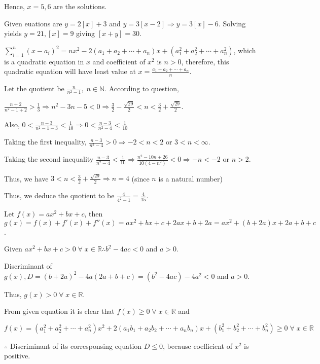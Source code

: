   Hence, $x = 5, 6$ are the solutions.
\item Given euations are $y = 2[x] + 3$ and $y = 3[x - 2] \Rightarrow y = 3[x] - 6$. Solving yields $y = 21,
  [x] = 9$ giving $[x + y] = 30$.
\item $\displaystyle\sum_{i=1}^n(x - a_i)^2 = nx^2 - 2(a_1 + a_2 + \cdots + a_n)x + (a_1^2 + a_2^2 + \cdots
  + a_n^2)$, which is a quadratic equation in $x$ and coefficient of $x^2$ is $n > 0$, therefore, this
  quadratic equation will have least value at $x = \frac{a_1 + a_2 + \cdots + a_n}{n}$.
\item Let the quotient be $\frac{n}{n^2 - 1},\;n\in\mathbb{N}$. According to question,

  $\frac{n + 2}{n^2 - 1 + 2}> \frac{1}{3}\Rightarrow n^2 - 3n - 5 < 0 \Rightarrow \frac{3}{2} -
  \frac{\sqrt{29}}{2} < n < \frac{3}{2} + \frac{\sqrt{29}}{2}$.

  Also, $0<\frac{n - 3}{n^2 - 1 - 3} < \frac{1}{10}\Rightarrow 0 < \frac{n - 3}{n^2 - 4} < \frac{1}{10}$

  Taking the first inequality, $\frac{n - 3}{n^2 - 4} > 0 \Rightarrow -2 < n < 2$ or $3 < n < \infty$.

  Taking the second inequality $\frac{n - 3}{n^2 - 4} < \frac{1}{10} \Rightarrow \frac{n^2 - 10n + 26}{10(4
    - n^2)} < 0 \Rightarrow -n < -2$  or $n > 2$.

  Thus, we have $3 < n < \frac{3}{2} + \frac{\sqrt{29}}{2}\Rightarrow n = 4$ (since $n$ is a natural number)

  Thus, we deduce the quotient to be $\frac{4}{4^2 - 1} = \frac{4}{15}$.
\item Let $f(x) = ax^2 + bx + c$, then $g(x) = f(x) + f'(x) + f''(x) = ax^2 + bx + c + 2ax + b + 2a = ax^2 +
  (b + 2a)x + 2a + b + c$.

  Given $ax^2 + bx + c > 0\;\forall\;x\in\mathbb{R}\therefore b^2 - 4ac < 0$ and $a > 0$.

  Discriminant of $g(x), D = (b + 2a)^2 - 4a(2a + b + c) = (b^2 - 4ac) - 4a^2 < 0$ and $a > 0$.

  Thus, $g(x) > 0\;\forall\;x\in\mathbb{R}$.
\item From given equation it is clear that $f(x)\geq 0\;\forall\;x\in\mathbb{R}$ and

  $f(x) = (a_1^2 + a_2^2 + \cdots + a_n^2)x^2 + 2(a_1b_1 + a_2b_2 + \cdots + a_nb_n)x + (b_1^2 + b_2^2 +
  \cdots + b_n^2)\geq 0\;\forall\;x\in\mathbb{R}$

  $\therefore$ Discriminant of its corresponsing equation $D \leq 0$, because coefficient of $x^2$ is
  positive.

